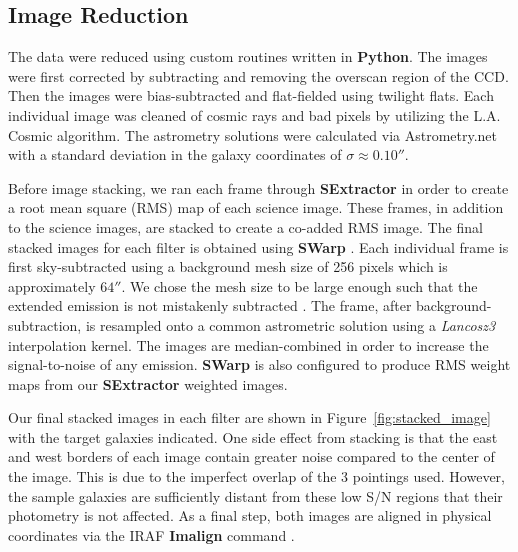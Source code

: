 \documentclass[twocolumn]{aastex6}
\begin{document}
\subsection{Image Reduction}
The data were reduced using custom routines written in \textbf{Python}. 
The images were first corrected by subtracting and removing the overscan region of the CCD. 
Then the images were bias-subtracted and flat-fielded using twilight flats. 
Each individual image was cleaned of cosmic rays and bad pixels by utilizing the L.A. Cosmic algorithm.
 The astrometry solutions were calculated via Astrometry.net \citep{Lang} with a standard deviation in the galaxy coordinates of $\sigma \approx 0.10''$. 

Before image stacking, we ran each frame through \textbf{SExtractor} \citep{Bertin} in order to create a root mean square (RMS) map of each science image.
 These frames, in addition to the science images, are stacked to create a co-added RMS image.
The final stacked images for each filter is obtained using \textbf{SWarp} \citep{Bertin}.
Each individual frame is first sky-subtracted using a background mesh size of 256 pixels which is approximately $64''$. 
We chose the mesh size to be large enough such that the extended emission is not mistakenly subtracted \citep{Battaia_2015}. 
The frame, after background-subtraction, is resampled onto a common astrometric solution using a \textit{Lancosz3} interpolation kernel. 
The images are median-combined in order to increase the signal-to-noise of any  emission. \textbf{SWarp} is also configured to produce RMS weight maps from our \textbf{SExtractor} weighted images.  

Our final stacked images in each filter are shown in Figure~\ref{fig:stacked_image} with the target galaxies indicated.  
One side effect from stacking is that the east and west borders of each image contain greater noise compared to the center of the image. This is due to the imperfect overlap of the 3 pointings used. However, the sample galaxies are sufficiently distant from these low S/N regions that their photometry is not affected. As a final step, both images are aligned in physical coordinates via the IRAF \textbf{Imalign} command \citep{Tody_1986}.
\end{document}

